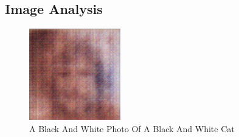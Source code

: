 \documentclass{article}%
\begin{document}
%
\subsection{Image Analysis}%
\label{subsec:ImageAnalysis}%


\begin{figure}[h!]%
\centering%
\includegraphics[width=150px]{500_fake_images/samples_5_60.png}%
\caption{A Black And White Photo Of A Black And White Cat}%
\end{figure}

%
\end{document}
